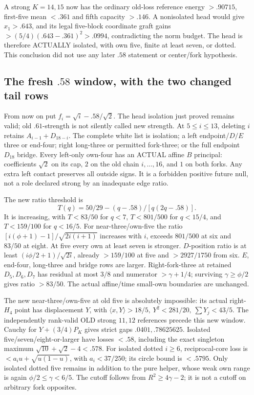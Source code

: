 \documentclass[11pt]{article}
\theoremstyle{definition}
\theoremstyle{remark}
\newcommand{\ip}[2]{\langle #1,#2\rangle}
\begin{document}
A strong \(K=14,15\) now has the ordinary old-loss reference
energy \(>.90715\), first-five mean \(<.361\) and
fifth capacity \(>.146\).
A nonisolated head would give \(x_1>.643\), and its legal five-block
coordinate graft gains \(>(5/4)(.643-.361)^2>.0994\),
contradicting the norm budget.
The head is therefore ACTUALLY isolated, with own five,
finite at least seven, or dotted. This conclusion did not use any
later \(.58\) statement or center/fork hypothesis.

\subsection{The fresh \(.58\) window, with the two changed tail rows}
\label{app:D18freshwindow}
From now on put \(f_i=\sqrt i-.58/\sqrt2\).
The head isolation just proved remains valid; old \(.61\)-strength
is not silently called new strength.
At \(5\leq i\leq13\), deleting \(i\) retains
\(A_{i-1}+D_{18-i}\).
The complete white list is isolation; a left endpoint/\(D/E\)
three or end-four; right long-three or permitted fork-three;
or the full endpoint \(D_{18}\) bridge.
Every left-only own-four has an ACTUAL affine \(B\) principal:
coefficients \(\sqrt2\) on its cap, \(2\) on the old chain
\(i,\ldots,16\), and \(1\) on both forks.
Any extra left contact preserves all outside signs.
It is a forbidden positive future null, not a role declared strong
by an inadequate edge ratio.

The new ratio threshold is
\[
 T(q)=50/29-(q-.58)/[q(2q-.58)].
\]
It is increasing, with \(T<83/50\) for \(q<7\),
\(T<801/500\) for \(q<15/4\), and \(T<159/100\) for \(q<16/5\).
For near-three/own-five the ratio
\([i(\phi+1)-1]/\sqrt{2i(i+1)}\) increases with \(i\),
exceeds \(801/500\) at six and \(83/50\) at eight.
At five every own at least seven is stronger.
\(D\)-position ratio is at least \((i\phi/2+1)/\sqrt{2i}\),
already \(>159/100\) at five and \(>2927/1750\) from six.
\(E\), end-four, long-three and bridge rows are larger.
Right-fork-three at retained \(D_5,D_6,D_7\) has residual
at most \(3/8\) and numerator \(>\gamma+1/4\);
surviving \(\gamma\geq\phi/2\) gives ratio \(>83/50\).
The actual affine/time small-own boundaries are unchanged.

The new near-three/own-five at old five is absolutely impossible:
its actual right-\(H_4\) point has displacement \(Y\), with
\(\ip xY>18/5,\ Y^2<281/20,\ \sum Y_j<43/5\).
The independently rank-valid OLD strong \(11,12\) references
precede this new window.
Cauchy for \(Y+(3/4)P_K\) gives strict gaps
\(.0401,.78625625\).
Isolated five/seven/eight-or-larger have losses \(<.58\),
including the exact singleton maximum
\(\sqrt{10}+\sqrt2-4<.578\).
For isolated dotted \(i\geq6\), reciprocal-core loss is
\(<a_iu+\sqrt{u(1-u)}\), with \(a_i<37/250\);
its circle bound is \(<.5795\).
Only isolated dotted five remains in addition to the pure helper,
whose weak own range is again \(\phi/2\leq\gamma<6/5\).
The cutoff follows from \(R^2\geq4\gamma-2\);
it is not a cutoff on arbitrary fork opposites.
\end{document}
